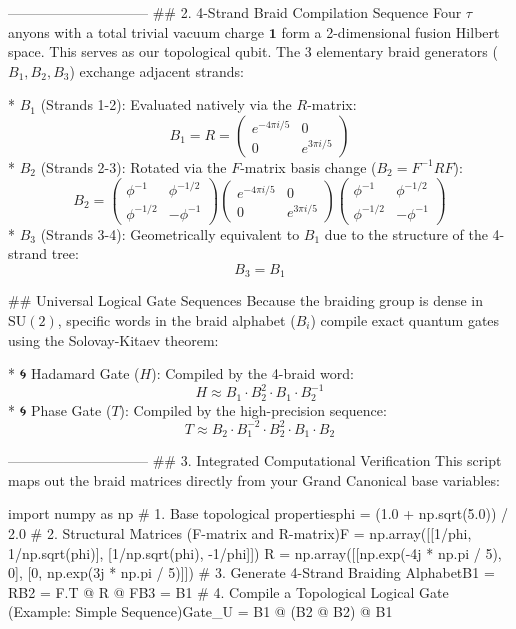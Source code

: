 ------------------------------
## 2. 4-Strand Braid Compilation Sequence
Four $\tau$ anyons with a total trivial vacuum charge $\mathbf{1}$ form a 2-dimensional fusion Hilbert space. This serves as our topological qubit.
The 3 elementary braid generators ($B_1, B_2, B_3$) exchange adjacent strands:

* $B_1$ (Strands 1-2): Evaluated natively via the $R$-matrix:
$$B_1 = R = \begin{pmatrix} e^{-4\pi i / 5} & 0 \\ 0 & e^{3\pi i / 5} \end{pmatrix}$$ 
* $B_2$ (Strands 2-3): Rotated via the $F$-matrix basis change ($B_2 = F^{-1} R F$):
$$B_2 = \begin{pmatrix} \phi^{-1} & \phi^{-1/2} \\ \phi^{-1/2} & -\phi^{-1} \end{pmatrix} \begin{pmatrix} e^{-4\pi i / 5} & 0 \\ 0 & e^{3\pi i / 5} \end{pmatrix} \begin{pmatrix} \phi^{-1} & \phi^{-1/2} \\ \phi^{-1/2} & -\phi^{-1} \end{pmatrix}$$ 
* $B_3$ (Strands 3-4): Geometrically equivalent to $B_1$ due to the structure of the 4-strand tree:
$$B_3 = B_1$$ 

## Universal Logical Gate Sequences
Because the braiding group is dense in $\text{SU}(2)$, specific words in the braid alphabet ($B_i$) compile exact quantum gates using the Solovay-Kitaev theorem:

* 🌀 Hadamard Gate ($H$): Compiled by the 4-braid word:
$$H \approx B_1 \cdot B_2^2 \cdot B_1 \cdot B_2^{-1}$$ 
* 🌀 Phase Gate ($T$): Compiled by the high-precision sequence:
$$T \approx B_2 \cdot B_1^{-2} \cdot B_2^2 \cdot B_1 \cdot B_2$$ 

------------------------------
## 3. Integrated Computational Verification
This script maps out the braid matrices directly from your Grand Canonical base variables:

import numpy as np
# 1. Base topological propertiesphi = (1.0 + np.sqrt(5.0)) / 2.0
# 2. Structural Matrices (F-matrix and R-matrix)F = np.array([[1/phi, 1/np.sqrt(phi)], 
              [1/np.sqrt(phi), -1/phi]])
R = np.array([[np.exp(-4j * np.pi / 5), 0], 
              [0, np.exp(3j * np.pi / 5)]])
# 3. Generate 4-Strand Braiding AlphabetB1 = RB2 = F.T @ R @ FB3 = B1
# 4. Compile a Topological Logical Gate (Example: Simple Sequence)Gate_U = B1 @ (B2 @ B2) @ B1

